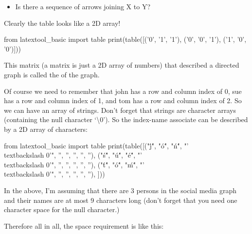 \begin{itemize}
\item
  Is there a sequence of arrows joining X to Y?
\end{itemize}

Clearly the table looks like a 2D array!
\begin{python}
from latextool_basic import table
print(table([('0', '1', '1'), ('0', '0', '1'), ('1', '0', '0')]))
\end{python}

This matrix (a matrix is just a 2D array of numbers) that described a directed graph is called the  of the graph.

Of course we need to remember that john has a row and column index of 0, sue has a row and column index of 1, and tom has a row and column index of 2. So we can have an array of strings. Don't forget that strings are character arrays (containing the null character `\textbackslash 0'). So the index-name associate can be described by a 2D array of characters:

\begin{python}
from latextool_basic import table
print(table([("\'j\'", "\'o\'", "\'n\'", "'\\textbackslash 0'", '', '', '', '', ''),
("\'s\'", "\'u\'", "\'e\'", "'\\textbackslash 0'", '', '', '', '', ''),
("\'t\'", "\'o\'", "\'m\'", "'\\textbackslash 0'", '', '', '', '', ''),
]))
\end{python}

In the above, I'm assuming that there are 3 persons in the social media graph and their names are at most 9 characters long (don't forget that you need one character space for the null character.)

Therefore all in all, the space requirement is like this:

